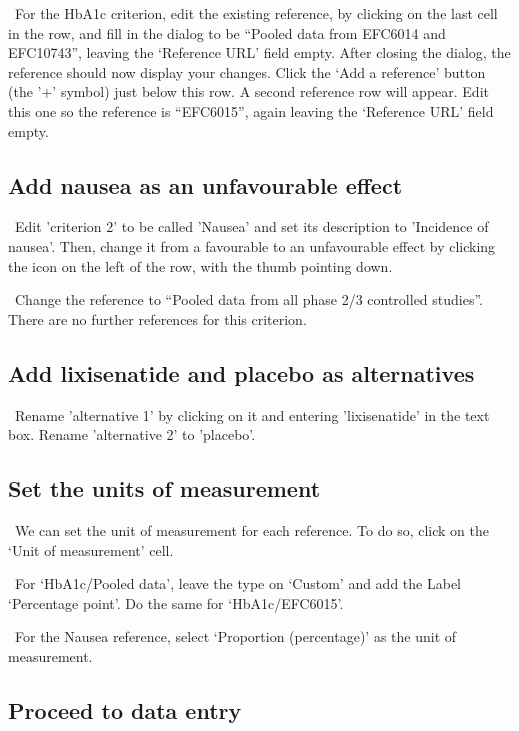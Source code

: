 \documentclass[00_mcda_tutorial.tex]{subfiles}
\begin{document}
\noindent \leftpointright \, For the HbA1c criterion, edit the existing reference, by clicking on the last cell in the row, and fill in the dialog to be  “Pooled data from EFC6014 and EFC10743”, leaving the ‘Reference URL’ field empty. After closing the dialog, the reference should now display your changes. Click  the ‘Add a reference’ button (the '+' symbol) just below this row. A second reference row will appear. Edit this one so the reference is “EFC6015”, again leaving the ‘Reference URL’ field empty.

\subsection*{Add nausea as an unfavourable effect}
\noindent \leftpointright \, Edit 'criterion 2' to be called 'Nausea' and set its description to 'Incidence of nausea'. Then, change it from a favourable to an unfavourable effect by clicking the icon on the left of the row, with the thumb pointing down.
\newline

\noindent \leftpointright \, Change the reference to “Pooled data from all phase 2/3 controlled studies”.  There are no further references for this criterion.

\subsection*{Add lixisenatide and placebo as alternatives}
\noindent \leftpointright \, Rename 'alternative 1' by clicking on it and entering 'lixisenatide' in the text box. Rename 'alternative 2' to 'placebo'.

\subsection*{Set the units of measurement}
\noindent \leftpointright \, We can set the unit of measurement for each reference. To do so, click on the ‘Unit of measurement’ cell.
\newline

\noindent \leftpointright \, For ‘HbA1c/Pooled data’, leave the type on ‘Custom’ and add the Label ‘Percentage point’. Do the same for ‘HbA1c/EFC6015’.
\newline

\noindent \leftpointright \, For the Nausea reference, select ‘Proportion (percentage)’ as the unit of measurement.
\newline

\subsection*{Proceed to data entry}
\end{document}
